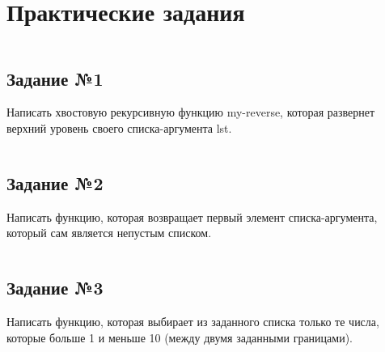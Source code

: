 \chapter{Практические задания}

\vspace{4mm}
\hfill
\begin{minipage}{0.92\linewidth}
\begin{lstlisting}
\end{lstlisting}
\end{minipage}

\section{Задание №1}

Написать хвостовую рекурсивную функцию my-reverse, которая развернет верхний
уровень своего списка-аргумента lst.

\vspace{4mm}
\hfill
\begin{minipage}{0.92\linewidth}
\begin{lstlisting}
\end{lstlisting}
\end{minipage}

\section{Задание №2}

Написать функцию, которая возвращает первый элемент списка-аргумента, который
сам является непустым списком.

\vspace{4mm}
\begin{minipage}{0.92\linewidth}
\begin{lstlisting}
\end{lstlisting}
\end{minipage}

\section{Задание №3}

Написать функцию, которая выбирает из заданного списка только те числа,
которые больше 1 и меньше 10 (между двумя заданными границами).

\vspace{4mm}
\begin{minipage}{0.92\linewidth}
\begin{lstlisting}
\end{lstlisting}
\end{minipage}

